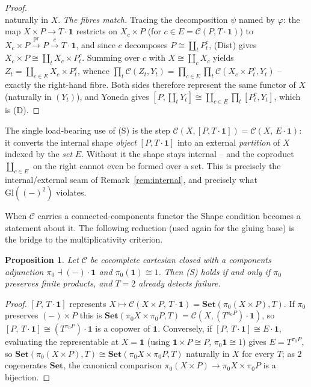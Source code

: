 \documentclass[11pt]{amsart}
\theoremstyle{plain}
\newtheorem{proposition}[theorem]{Proposition}
\theoremstyle{definition}
\newcommand{\C}{\mathcal{C}}
\newcommand{\Setb}{\mathbf{Set}}
\newcommand{\Gl}{\mathrm{Gl}}
\newcommand{\one}{\mathbf{1}}
\newcommand{\pizero}{\pi_0}
\begin{document}
\begin{proof}
\[\]
naturally in $X$. \emph{The fibres match.} Tracing the decomposition $\psi$ named by $\varphi$: the map
$X\times P\to T\cdot\one$ restricts on $X_c\times P$ (for $c\in E=\C(P,T\cdot\one)$) to
$X_c\times P\xrightarrow{\mathrm{pr}}P\xrightarrow{c}T\cdot\one$, and since $c$ decomposes
$P\cong\coprod_t P^c_t$, (Dist) gives $X_c\times P\cong\coprod_t X_c\times P^c_t$. Summing over $c$ with
$X\cong\coprod_c X_c$ yields $Z_t=\coprod_{c\in E}X_c\times P^c_t$, whence
$\prod_t\C(Z_t,Y_t)=\prod_{c\in E}\prod_t\C(X_c\times P^c_t,Y_t)$ -- exactly the right-hand fibre. Both
sides therefore represent the same functor of $X$ (naturally in $(Y_t)$), and Yoneda gives
$[P,\coprod_t Y_t]\cong\coprod_{c\in E}\prod_t[P^c_t,Y_t]$, which is (D).
\end{proof}

The single load-bearing use of (S) is the step $\C(X,[P,T\cdot\one])=\C(X,\,E\cdot\one)$: it converts
the internal shape \emph{object} $[P,T\cdot\one]$ into an external \emph{partition} of $X$ indexed by
the \emph{set} $E$. Without it the shape stays internal -- and the coproduct $\coprod_{c\in E}$ on the
right cannot even be formed over a set. This is precisely the internal/external seam of
Remark~\ref{rem:internal}, and precisely what $\Gl((-)^2)$ violates.

When $\C$ carries a connected-components functor the Shape condition becomes a statement about it. The
following reduction (used again for the gluing base) is the bridge to the multiplicativity criterion.

\begin{proposition}\label{prop:reduction}
Let $\C$ be cocomplete cartesian closed with a components adjunction $\pizero\dashv(-)\cdot\one$ and
$\pizero(\one)\cong 1$. Then \emph{(S)} holds if and only if $\pizero$ preserves finite products, and
$T=2$ already detects failure.
\end{proposition}
\begin{proof}
$[P,\,T\cdot\one]$ represents $X\mapsto\C(X\times P,\,T\cdot\one)=\Setb(\pizero(X\times P),T)$. If
$\pizero$ preserves $(-)\times P$ this is $\Setb(\pizero X\times\pizero P,T)=\C(X,(T^{\pizero P})\cdot
\one)$, so $[P,\,T\cdot\one]\cong(T^{\pizero P})\cdot\one$ is a copower of $\one$. Conversely, if
$[P,\,T\cdot\one]\cong E\cdot\one$, evaluating the representable at $X=\one$ (using $\one\times P\cong
P$, $\pizero\one\cong 1$) gives $E=T^{\pizero P}$, so
$\Setb(\pizero(X\times P),T)\cong\Setb(\pizero X\times\pizero P,T)$ naturally in $X$ for every $T$;
as $2$ cogenerates $\Setb$, the canonical comparison $\pizero(X\times P)\to\pizero X\times\pizero P$
is a bijection.
\end{proof}
\end{document}
